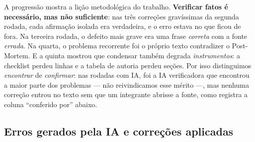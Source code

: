 \documentclass[11pt,a4paper]{article}
\begin{document}
A progressão mostra a lição metodológica do trabalho. \textbf{Verificar fatos é necessário, mas não
suficiente}: nas três correções gravíssimas da segunda rodada, cada afirmação isolada era verdadeira, e o
erro estava no que ficou de fora. Na terceira rodada, o defeito mais grave era uma frase \emph{correta}
com a fonte \emph{errada}. Na quarta, o problema recorrente foi o próprio texto contradizer o Post-Mortem. E a quinta mostrou que
condensar também degrada \emph{instrumentos}: a checklist perdeu linhas e a tabela de autoria perdeu seções.
Por isso distinguimos \emph{encontrar} de \emph{confirmar}: nas rodadas com IA, foi a IA verificadora que
encontrou a maior parte dos problemas --- não reivindicamos esse mérito ---, mas nenhuma correção entrou
no texto sem que um integrante abrisse a fonte, como registra a coluna ``conferido por'' abaixo.

\subsection{Erros gerados pela IA e correções aplicadas}
\label{sec:erros}
\end{document}
